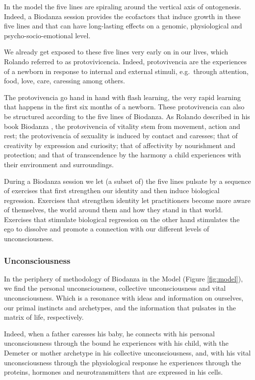 \documentclass[
  11pt,
]{book}
\begin{document}
In the model the five lines are spiraling around the vertical axis of ontogenesis. Indeed, a Biodanza session provides the ecofactors that induce growth in these five lines and that can have long-lasting effects on a genomic, physiological and psycho-socio-emotional level.

We already get exposed to these five lines very early on in our lives, which Rolando referred to as protovivicencia. Indeed, protovivencia are the experiences of a newborn in response to internal and external stimuli, e.g.~through attention, food, love, care, caressing among others.

The protovivencia go hand in hand with flash learning, the very rapid learning that happens in the first six months of a newborn. These protovivencia can also be structured according to the five lines of Biodanza. As Rolando described in his book Biodanza \citep{toro2008}, the protovivencia of vitality stem from movement, action and rest; the protovivencia of sexuality is induced by contact and caresses; that of creativity by expression and curiosity; that of affectivity by nourishment and protection; and that of transcendence by the harmony a child experiences with their environment and surroundings.

During a Biodanza session we let (a subset of) the five lines pulsate by a sequence of exercises that first strengthen our identity and then induce biological regression.
Exercises that strengthen identity let practitioners become more aware of themselves, the world around them and how they stand in that world. Exercises that stimulate biological regression on the other hand stimulates the ego to dissolve and promote a connection with our different levels of unconsciousness.

\hypertarget{unconsciousness}{%
\subsubsection{Unconsciousness}\label{unconsciousness}}

In the periphery of methodology of Biodanza in the Model (Figure \ref{fig:model}), we find the personal unconsciousness, collective unconsciousness and vital unconsciousness.
Which is a resonance with ideas and information on ourselves, our primal instincts and archetypes, and the information that pulsates in the matrix of life, respectively.

Indeed, when a father caresses his baby, he connects with his personal unconsciousness through the bound he experiences with his child, with the Demeter or mother archetype in his collective unconsciousness, and, with his vital unconsciousness through the physiological response he experiences through the proteins, hormones and neurotransmitters that are expressed in his cells.
\end{document}
